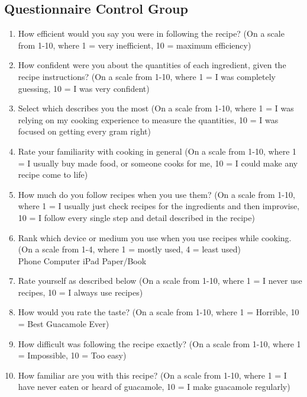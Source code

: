 \subsection{Questionnaire Control Group}
\label{app:questionnaire-control}
\begin{enumerate}
    \item How efficient would you say you were in following the recipe? (On a scale from 1-10, where 1 = very inefficient, 10 = maximum efficiency)
    
    \item How confident were you about the quantities of each ingredient, given the recipe instructions? (On a scale from 1-10, where 1 = I was completely guessing, 10 = I was very confident)
    
    \item Select which describes you the most (On a scale from 1-10, where 1 = I was relying on my cooking experience to measure the quantities, 10 = I was focused on getting every gram right)
    
    \item Rate your familiarity with cooking in general (On a scale from 1-10, where 1 = I usually buy made food, or someone cooks for me, 10 = I could make any recipe come to life)
    
    \item How much do you follow recipes when you use them? (On a scale from 1-10, where 1 = I usually just check recipes for the ingredients and then improvise, 10 = I follow every single step and detail described in the recipe)
    
    \item Rank which device or medium you use when you use recipes while cooking. (On a scale from 1-4, where 1 = mostly used, 4 = least used)\\
    Phone \hfill Computer \hfill iPad \hfill Paper/Book
    
    \item Rate yourself as described below (On a scale from 1-10, where 1 = I never use recipes, 10 = I always use recipes)
    
    \item How would you rate the taste? (On a scale from 1-10, where 1 = Horrible, 10 = Best Guacamole Ever)
    
    \item How difficult was following the recipe exactly? (On a scale from 1-10, where 1 = Impossible, 10 = Too easy)
    
    \item How familiar are you with this recipe? (On a scale from 1-10, where 1 = I have never eaten or heard of guacamole, 10 = I make guacamole regularly)
    

\end{enumerate}
